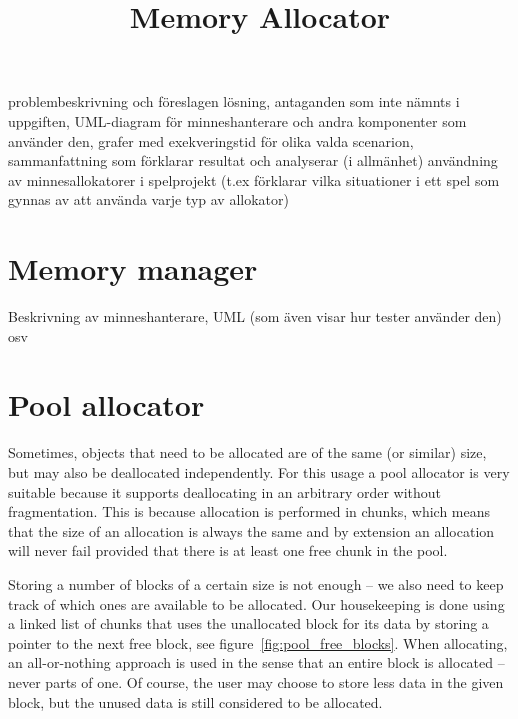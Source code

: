 \documentclass{article}
\title{Memory Allocator}
\begin{document}
\maketitle
\thispagestyle{empty}
\newpage

\tableofcontents
\thispagestyle{empty}
\newpage

\setcounter{page}{1}

problembeskrivning och föreslagen lösning, antaganden som inte nämnts i uppgiften, UML-diagram för minneshanterare och andra komponenter som använder den, grafer med exekveringstid för olika valda scenarion, sammanfattning som förklarar resultat och analyserar (i allmänhet) användning av minnesallokatorer i spelprojekt (t.ex förklarar vilka situationer i ett spel som gynnas av att använda varje typ av allokator)

\section{Memory manager}
Beskrivning av minneshanterare, UML (som även visar hur tester använder den) osv

\section{Pool allocator}
Sometimes, objects that need to be allocated are of the same (or similar) size, but may also be deallocated independently. For this usage a pool allocator is very suitable because it supports deallocating in an arbitrary order without fragmentation. This is because allocation is performed in chunks, which means that the size of an allocation is always the same and by extension an allocation will never fail provided that there is at least one free chunk in the pool.

Storing a number of blocks of a certain size is not enough -- we also need to keep track of which ones are available to be allocated. Our housekeeping is done using a linked list of chunks that uses the unallocated block for its data by storing a pointer to the next free block, see figure~\ref{fig:pool_free_blocks}. When allocating, an all-or-nothing approach is used in the sense that an entire block is allocated -- never parts of one. Of course, the user may choose to store less data in the given block, but the unused data is still considered to be allocated.
\end{document}

